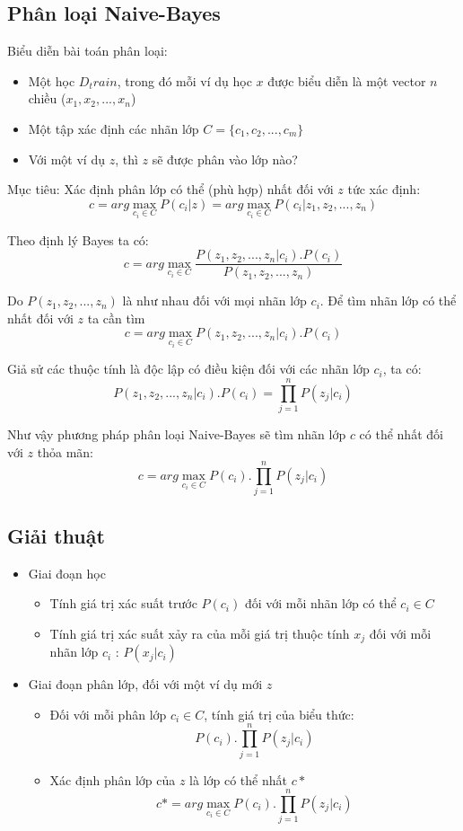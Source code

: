 \documentclass[a4paper,12pt]{report}
\begin{document}
\subsection{Phân loại Naive-Bayes}
Biểu diễn bài toán phân loại:
\begin{itemize}
\item Một học $D_train$, trong đó mỗi ví dụ học $x$ được biểu diễn là một vector $n$ chiều ($x_1,x_2, ..., x_n$)
\item Một tập xác định các nhãn lớp $C = \{c_1, c_2, ..., c_m\}$
\item Với một ví dụ $z$, thì $z$ sẽ được phân vào lớp nào?
\end{itemize}
\par Mục tiêu: Xác định phân lớp có thể (phù hợp) nhất đối với $z$ tức 
xác định:
$$c = \displaystyle arg\max_{c_i \in C}P(c_i|z) =\displaystyle arg\max_{c_i \in C}P(c_i|z_1,z_2,...,z_n) $$
\par Theo định lý Bayes ta có:
$$c = \displaystyle arg\max_{c_i \in C}\frac{P(z_1,z_2,...,z_n|c_i).P(c_i)}{P(z_1,z_2,...,z_n)}$$
\par Do $P(z_1,z_2,...,z_n)$ là như nhau đối với mọi nhãn lớp $c_i$. Để tìm nhãn lớp có thể nhất đối với $z$ ta cần tìm 
$$c = \displaystyle arg\max_{c_i \in C}P(z_1,z_2,...,z_n|c_i).P(c_i)$$
\par Giả sử các thuộc tính là độc lập có điều kiện đối với các nhãn lớp $c_i$, ta có:
$$P(z_1,z_2,...,z_n|c_i).P(c_i) = \prod_{j=1}^n P(z_j|c_i)$$
\par Như vậy phương pháp phân loại Naive-Bayes sẽ tìm nhãn lớp $c$ có thể nhất đối với $z$ thỏa mãn:
$$c = \displaystyle arg\max_{c_i \in C}P(c_i).\prod_{j=1}^n P(z_j|c_i)$$
\subsection{Giải thuật}
\begin{itemize}
\item Giai đoạn học
\begin{itemize}
\item Tính giá trị xác suất trước $P(c_i)$ đối với mỗi nhãn lớp có thể $c_i \in C$
\item Tính giá trị xác suất xảy ra của mỗi giá trị thuộc tính $x_j$ đối với mỗi nhãn lớp $c_i$ : $P(x_j|c_i)$
\end{itemize}
\item Giai đoạn phân lớp, đối với một ví dụ mới $z$
\begin{itemize}
\item Đối với mỗi phân lớp $c_i \in C$, tính giá trị của biểu thức:
$$P(c_i).\prod_{j=1}^n P(z_j|c_i)$$
\item Xác định phân lớp của $z$ là lớp có thể nhất $c*$
$$c* = \displaystyle arg\max_{c_i \in C}P(c_i).\prod_{j=1}^n P(z_j|c_i)$$   
\end{itemize}
\end{itemize}
\end{document}
